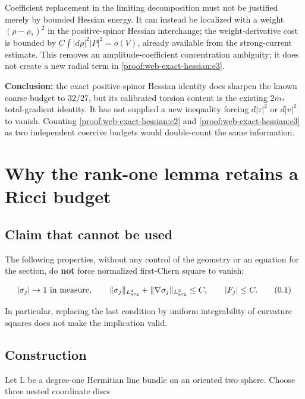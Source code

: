 Coefficient replacement in the limiting decomposition must not be justified merely by bounded Hessian energy. It can instead be localized with a weight \((\rho-\rho_*)^2\) in the positive-spinor Hessian interchange; the weight-derivative cost is bounded by \(C\int|d\rho|^2|P|^2=o(V)\), already available from the strong-current estimate. This removes an amplitude-coefficient concentration ambiguity; it does not create a new radial term in \eqref{proof:web-exact-hessian:e3}.

\textbf{Conclusion:} the exact positive-spinor Hessian identity does sharpen the known coarse budget to \(32/27\), but its calibrated torsion content is the existing \(2m_*\) total-gradient identity. It has not supplied a new inequality forcing \(d|\tau|^2\) or \(d|v|^2\) to vanish. Counting \eqref{proof:web-exact-hessian:e2} and \eqref{proof:web-exact-hessian:e3} as two independent coercive budgets would double-count the same information.


\section{Why the rank-one lemma retains a Ricci budget}
\label{sec:web-line-limitation}
\hypertarget{proof:web-line-limitation:Claim-that-cannot-be-used}{%
\subsection{Claim that cannot be used}\label{proof:web-line-limitation:Claim-that-cannot-be-used}}

The following properties, without any control of the geometry or an equation for the section, do \textbf{not} force normalized first-Chern square to vanish:

\[
 |\sigma_j|\to1\text{ in measure},\qquad
 \|\sigma_j\|_{L^4_{\rm avg}}+\|\nabla\sigma_j\|_{L^2_{\rm avg}}\le C,
 \qquad |F_j|\le C.
\tag{\thesection.1}\label{proof:web-line-limitation:e1}
\]

In particular, replacing the last condition by uniform integrability of curvature squares does not make the implication valid.

\hypertarget{proof:web-line-limitation:Construction}{%
\subsection{Construction}\label{proof:web-line-limitation:Construction}}

Let L be a degree-one Hermitian line bundle on an oriented two-sphere. Choose three nested coordinate discs

